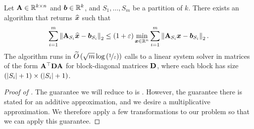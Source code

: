 \documentclass[11pt]{article}
\numberwithin{equation}{section}
\begin{document}
\begin{lemma}
\label{lemma:ipm_log_barrier}
Let $\mathbf{A} \in \mathbb{R}^{k \times n}$ and \(\bm{b} \in \mathbb{R}^k\), and  $S_1, \dots, S_m$ be a partition of $k$. There exists an algorithm that returns $\widehat{\bm{x}}$ such that
\begin{align*}
    \sum_{i=1}^m \left\lVert \mathbf{A}_{S_i}\widehat{\bm{x}}-\bm{b}_{S_i} \right\rVert_2 \le (1+\varepsilon)\min_{\bm{x}\in\mathbb{R}^n} \sum_{i=1}^m \left\lVert \mathbf{A}_{S_i} \bm{x}-\bm{b}_{S_i} \right\rVert_2.
\end{align*}
The algorithm runs in $\widetilde{O}\left(\sqrt{m}\log\left(\nicefrac{1}{\varepsilon}\right)\right)$ calls to a linear system solver in matrices of the form $\mathbf{A}^{\top}\mathbf{D}\mathbf{A}$ for block-diagonal matrices $\mathbf{D}$, where each block has size $(\left\lvert S_i \right\rvert+1) \times (\left\lvert S_i \right\rvert+1)$.
\end{lemma}
\begin{proof}[Proof of ]
The guarantee we will reduce to is \cite[Theorem 5.2]{xy97}. However, the guarantee there is stated for an additive approximation, and we desire a multiplicative approximation. We therefore apply a few transformations to our problem so that we can apply this guarantee.


\end{proof}
\end{document}

